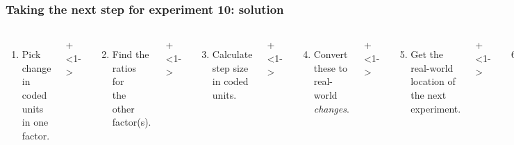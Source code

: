 \begin{frame}\frametitle{Taking the next step for experiment 10: {\color{myOrange}solution}}
	\begin{columns}[T]
		
			\vspace{0.1cm}
			{\tiny 
				\begin{enumerate}
					\item	Pick change in coded units in one factor.
				\end{enumerate}
			 \par}
			 
			\onslide+<1->{
				{\tiny 
					\begin{enumerate}\setcounter{enumi}{1}
						\item	Find the ratios for\\ the other factor(s).
					\end{enumerate}
				
				\par}
			}
			
			\vspace{0.0cm}
			\onslide+<1->{
				{\tiny 
					\begin{enumerate}\setcounter{enumi}{2}
						\item	Calculate step size in coded units.
					\end{enumerate}
				
				\par}
			}
			
			\onslide+<1->{
				{\tiny 
					\begin{enumerate}\setcounter{enumi}{3}
						\item	Convert these to real-world \emph{changes}.
					\end{enumerate}
				
				\par}
			}
			
			\onslide+<1->{
				{\tiny 
					\begin{enumerate}\setcounter{enumi}{4}
						\item	Get the real-world location
						of the next experiment.
					\end{enumerate}
				
				\par}
			}
			
			
			\vspace{-0.2cm}
			\onslide+<1->{
				{\tiny 
					\begin{enumerate}\setcounter{enumi}{5}
						\item	Convert these back\\ to coded-units.
					\end{enumerate}
				
}}
\end{columns}
\end{frame}
